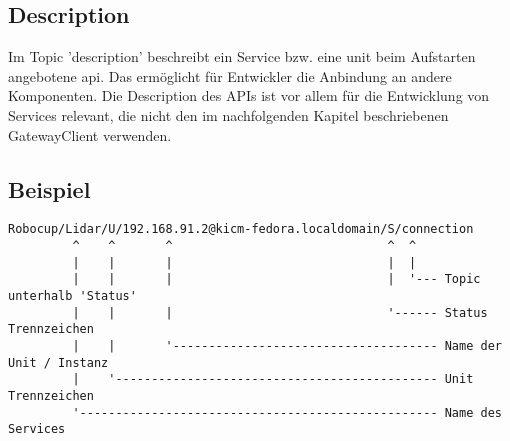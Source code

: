 \subsection{Description}
Im Topic '\gls{description}' beschreibt ein Service bzw. eine \acrshort{unit} beim Aufstarten angebotene \acrshort{api}. Das ermöglicht für Entwickler die Anbindung an andere Komponenten. Die Description des APIs ist vor allem für die Entwicklung von Services relevant, die nicht den im nachfolgenden Kapitel beschriebenen GatewayClient verwenden.
\subsection{Beispiel}

\begin{verbatim}
Robocup/Lidar/U/192.168.91.2@kicm-fedora.localdomain/S/connection
         ^    ^       ^                              ^  ^
         |    |       |                              |  |
         |    |       |                              |  '--- Topic unterhalb 'Status'
         |    |       |                              '------ Status Trennzeichen
         |    |       '------------------------------------- Name der Unit / Instanz
         |    '--------------------------------------------- Unit Trennzeichen
         '-------------------------------------------------- Name des Services
\end{verbatim}

